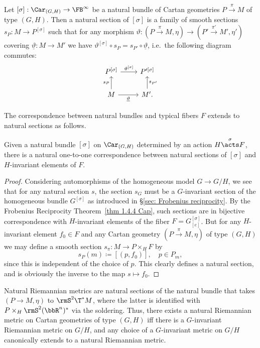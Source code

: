 \begin{defn}
    Let $[\sigma]:\Car_{(G,H)}\to \FB^\infty$ be a natural bundle of Cartan geometries $P\overset{\pi}{\to}M$ of type $(G,H)$. Then a natural section of $[\sigma]$ is a family of smooth sections $s_{P}:M\to P^{[\sigma]}$ such that for any morphism $\vartheta:(P\overset{\pi}{\to} M,\eta)\to (P'\overset{\pi'}{\to} M',\eta')$ covering $\underline{\vartheta}:M\to M'$ we have $\vartheta^{[\sigma]}\circ s_P=s_{P'}\circ \underline{\vartheta}$, i.e.\ the following diagram commutes:
    \[
    \begin{tikzcd}
        P^{[\sigma]}\arrow[r,"\vartheta^{[\sigma]}"] & P^{\prime[\sigma]}\\
        M\arrow[u,"s_P"]\arrow[r,swap,"\underline{\vartheta}"]& M'.\arrow[u,swap,"s_{P'}"]
    \end{tikzcd}
    \]
\end{defn}

The correspondence between natural bundles and typical fibers $F$ extends to natural sections as follows.

\begin{prop}\label{prop natural sections}
    Given a natural bundle $[\sigma]$ on $\Car_{(G,H)}$ determined by an action $H\overset{\sigma}{\acts}F$, there is a natural one-to-one correspondence between natural sections of $[\sigma]$ and $H$-invariant elements of $F$.
\end{prop}
\begin{proof}
    Considering automorphisms of the homogeneous model $G\to G\slash H$, we see that for any natural section $s$, the section $s_G$ must be a $G$-invariant section of the homogeneous bundle $G^{[\sigma]}$ as introduced in \S\ref{sec: Frobenius reciprocity}. By the Frobenius Reciprocity Theorem~\ref{thm 1.4.4 Cap}, such sections are in bijective correspondence with $H$-invariant elements of the fiber $F=G^{[\sigma]}_{[e]}$.
    But for any $H$-invariant element $f_0\in F$ and any Cartan geometry $(P\overset{\pi}{\to}M,\eta)$ of type $(G,H)$ we may define a smooth section $s_\pi:M\to P\times_H F$ by 
    \[s_P(m)\coloneqq [(p,f_0)],\quad p\in P_m,\]
    since this is independent of the choice of $p$.  This clearly defines a natural section, and is obviously the inverse to the map $s\mapsto f_0$.
\end{proof}

\begin{example}
    Natural Riemannian metrics are natural sections of the natural bundle that takes $(P\to M,\eta)$ to $\rmS^2 \T^\ast M$, where the latter is identified with $P\times_H \rmS^2(\bbR^n)^\ast$ via the soldering. Thus, there exists a natural Riemannian metric on Cartan geometries of type $(G,H)$ iff there is a $G$-invariant Riemannian metric on $G\slash H$, and any choice of a $G$-invariant metric on $G\slash H$ canonically extends to a natural Riemannian metric.
\end{example}


